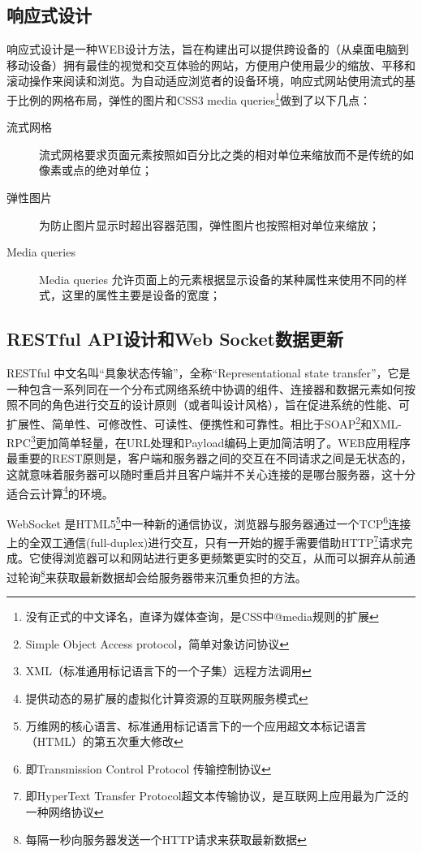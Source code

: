 \subsection{响应式设计}
响应式设计是一种WEB设计方法，旨在构建出可以提供跨设备的（从桌面电脑到移动设备）拥有最佳的视觉和交互体验的网站，方便用户使用最少的缩放、平移和滚动操作来阅读和浏览。\supercite{marcotte2013responsive}为自动适应浏览者的设备环境，响应式网站使用流式的基于比例的网格布局，弹性的图片和CSS3 media queries\footnote{没有正式的中文译名，直译为媒体查询，是CSS中@media规则的扩展}做到了以下几点：
\begin{description}
  \item[流式网格] 流式网格要求页面元素按照如百分比之类的相对单位来缩放而不是传统的如像素或点的绝对单位；
  \item[弹性图片] 为防止图片显示时超出容器范围，弹性图片也按照相对单位来缩放；
  \item[Media queries] Media queries 允许页面上的元素根据显示设备的某种属性来使用不同的样式，这里的属性主要是设备的宽度；
\end{description}

\subsection{RESTful API设计和Web Socket数据更新}
RESTful 中文名叫“具象状态传输”，全称“Representational state transfer”，它是一种包含一系列同在一个分布式网络系统中协调的组件、连接器和数据元素如何按照不同的角色进行交互的设计原则（或者叫设计风格），旨在促进系统的性能、可扩展性、简单性、可修改性、可读性、便携性和可靠性。\supercite{fielding2002principled,fielding2000architectural}相比于SOAP\footnote{Simple Object Access protocol，简单对象访问协议}和XML-RPC\footnote{XML（标准通用标记语言下的一个子集）远程方法调用}更加简单轻量，在URL处理和Payload编码上更加简洁明了。WEB应用程序最重要的REST原则是，客户端和服务器之间的交互在不同请求之间是无状态的，这就意味着服务器可以随时重启并且客户端并不关心连接的是哪台服务器，这十分适合云计算\footnote{提供动态的易扩展的虚拟化计算资源的互联网服务模式}的环境。

WebSocket 是HTML5\footnote{万维网的核心语言、标准通用标记语言下的一个应用超文本标记语言（HTML）的第五次重大修改}中一种新的通信协议，浏览器与服务器通过一个TCP\footnote{即Transmission Control Protocol 传输控制协议}连接上的全双工通信(full-duplex)进行交互，只有一开始的握手需要借助HTTP\footnote{即HyperText Transfer Protocol超文本传输协议，是互联网上应用最为广泛的一种网络协议}请求完成。它使得浏览器可以和网站进行更多更频繁更实时的交互，从而可以摒弃从前通过轮询\footnote{每隔一秒向服务器发送一个HTTP请求来获取最新数据}来获取最新数据却会给服务器带来沉重负担的方法。

